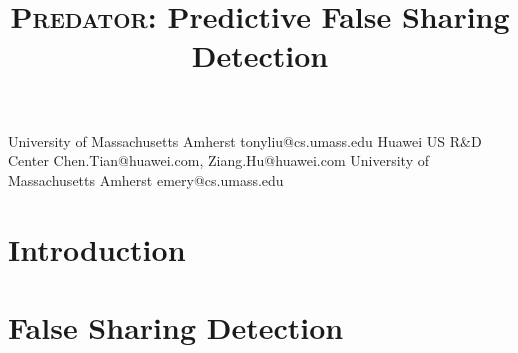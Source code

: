 \documentclass[9pt]{sigplanconf}
\date{} %
\newcommand{\Predator}{{\scshape Predator}}
\begin{document}


\title{\Predator{}: Predictive False Sharing Detection}
           {University of Massachusetts Amherst}
           {tonyliu@cs.umass.edu}
           {Huawei US R\&D Center}
           {Chen.Tian@huawei.com, Ziang.Hu@huawei.com}
           {University of Massachusetts Amherst}
           {emery@cs.umass.edu}

\maketitle

\begin{abstract}

\end{abstract}

\begin{comment}
\category{CR-number}{subcategory}{third-level}

\terms
term1, term2

\keywords
keyword1, keyword2
\end{comment}

\section{Introduction}



\section{False Sharing Detection}

\end{document}
